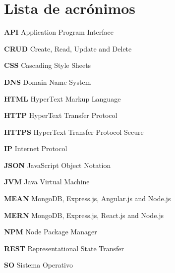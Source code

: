 \section*{Lista de acrónimos}

\noindent \textbf{API} Application Program Interface \newline \smallskip 

\noindent \textbf{CRUD} Create, Read, Update and Delete \newline \smallskip

\noindent \textbf{CSS} Cascading Style Sheets \newline \smallskip

\noindent \textbf{DNS} Domain Name System \newline \smallskip

\noindent \textbf{HTML} HyperText Markup Language \newline \smallskip

\noindent \textbf{HTTP} HyperText Transfer Protocol \newline \smallskip

\noindent \textbf{HTTPS} HyperText Transfer Protocol Secure \newline \smallskip

\noindent \textbf{IP} Internet Protocol \newline \smallskip

\noindent \textbf{JSON} JavaScript Object Notation \newline \smallskip

\noindent \textbf{JVM} Java Virtual Machine \newline \smallskip

\noindent \textbf{MEAN} MongoDB, Express.js, Angular.js and Node.js \newline \smallskip 

\noindent \textbf{MERN} MongoDB, Express.js, React.js and Node.js \newline \smallskip

\noindent \textbf{NPM} Node Package Manager \newline \smallskip

\noindent \textbf{REST} Representational State Transfer \newline \smallskip

\noindent \textbf{SO} Sistema Operativo \newline \smallskip